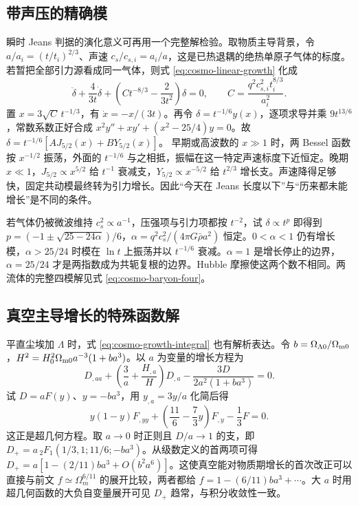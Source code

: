 \subsection{带声压的精确模}

瞬时 Jeans 判据的演化意义可再用一个完整解检验。取物质主导背景，令 $a/a_i=(t/t_i)^{2/3}$、声速 $c_s/c_{s,i}=a_i/a$，这是已热退耦的绝热单原子气体的标度。若暂把全部引力源看成同一气体，则式 \eqref{eq:cosmo-linear-growth} 化成
\[
 \ddot\delta+\frac4{3t}\dot\delta+
       \left(Ct^{-8/3}-\frac2{3t^2}\right)\delta=0,\qquad
 C=\frac{q^2c_{s,i}^2t_i^{8/3}}{a_i^2}.
\]
置 $x=3\sqrt C\,t^{-1/3}$，有 $\dot x=-x/(3t)$。再令 $\delta=t^{-1/6}y(x)$，逐项求导并乘 $9t^{13/6}$，常数系数正好合成 $x^2y''+xy'+(x^2-25/4)y=0$。故 $\delta=t^{-1/6}[A J_{5/2}(x)+B Y_{5/2}(x)]$。
早期或高波数的 $x\gg1$ 时，两 Bessel 函数按 $x^{-1/2}$ 振荡，外面的 $t^{-1/6}$ 与之相抵，振幅在这一特定声速标度下近恒定。晚期 $x\ll1$，$J_{5/2}\propto x^{5/2}$ 给 $t^{-1}$ 衰减支，$Y_{5/2}\propto x^{-5/2}$ 给 $t^{2/3}$ 增长支。声速降得足够快，固定共动模最终转为引力增长。因此“今天在 Jeans 长度以下”与“历来都未能增长”是不同的条件。

若气体仍被微波维持 $c_s^2\propto a^{-1}$，压强项与引力项都按 $t^{-2}$，试 $\delta\propto t^p$ 即得到 $p=(-1\pm\sqrt{25-24\alpha})/6$，$\alpha=q^2c_s^2/(4\pi G\bar\rho a^2)$ 恒定。$0<\alpha<1$ 仍有增长模，$\alpha>25/24$ 时模在 $\ln t$ 上振荡并以 $t^{-1/6}$ 衰减。$\alpha=1$ 是增长停止的边界，$\alpha=25/24$ 才是两指数成为共轭复根的边界。Hubble 摩擦使这两个数不相同。两流体的完整四模解见式 \eqref{eq:cosmo-baryon-four}。

\subsection{真空主导增长的特殊函数解}

平直尘埃加 $\Lambda$ 时，式 \eqref{eq:cosmo-growth-integral} 也有解析表达。令 $b=\Omega_{\Lambda0}/\Omega_{\rm m0}$，$H^2=H_0^2\Omega_{\rm m0}a^{-3}(1+ba^3)$。以 $a$ 为变量的增长方程为
\[
 D_{,aa}+\left(\frac3a+\frac{H_{,a}}H\right)D_{,a}
                 -\frac{3D}{2a^2(1+ba^3)}=0.
\]
试 $D=aF(y)$、$y=-ba^3$，用 $y_{,a}=3y/a$ 化简后得
\[
 y(1-y)F_{,yy}+\left(\frac{11}{6}-\frac73y\right)F_{,y}
                                   -\frac13F=0.
\]
这正是超几何方程。取 $a\to0$ 时正则且 $D/a\to1$ 的支，即 $D_+=a\,{}_2F_1(1/3,1;11/6;-ba^3)$。从级数定义的首两项可得 $D_+=a[1-(2/11)ba^3+O(b^2a^6)]$。这使真空能对物质期增长的首次改正可以直接与前文 $f\simeq\Omega_m^{6/11}$ 的展开比较，两者都给 $f=1-(6/11)ba^3+\cdots$。大 $a$ 时用超几何函数的大负自变量展开可见 $D_+$ 趋常，与积分收敛性一致。

